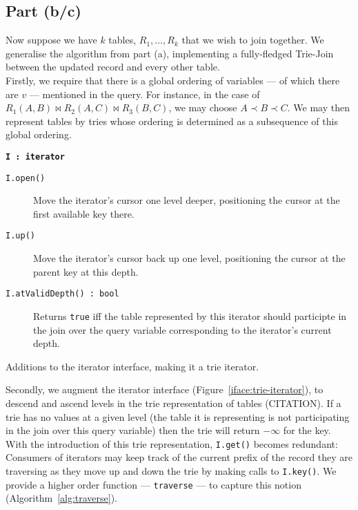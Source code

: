 \subsection{Part (b/c)}\label{sec:q-1-b}

Now suppose we have $k$ tables, $R_1,\ldots,R_k$ that we wish to join together. We generalise the algorithm from part (a), implementing a fully-fledged Trie-Join between the updated record and every other table.\\[1em]

Firstly, we require that there is a global ordering of variables --- of which there are $v$ --- mentioned in the query. For instance, in the case of $R_1(A,B)\bowtie R_2(A,C)\bowtie R_3(B,C)$, we may choose $A\prec B\prec C$. We may then represent tables by tries whose ordering is determined as a subsequence of this global ordering.\\[1em]

\begin{marginfigure}
  \textbf{\texttt{I\,:\,iterator}}
  \begin{description}
    \item[\texttt{I.open()}]
      Move the iterator's cursor one level deeper, positioning the cursor at the first available key there.
    \item[\texttt{I.up()}]
      Move the iterator's cursor back up one level, positioning the cursor at the parent key at this depth.
    \item[\texttt{I.atValidDepth()\,:\,bool}]
      Returns \texttt{true} iff the table represented by this iterator should participte in the join over the query variable corresponding to the iterator's current depth.
  \end{description}
  \caption{Additions to the iterator interface, making it a trie iterator.}\label{iface:trie-iterator}
\end{marginfigure}

Secondly, we augment the iterator interface (Figure~\ref{iface:trie-iterator}), to descend and ascend levels in the trie representation of tables (CITATION). If a trie has no values at a given level (the table it is representing is not participating in the join over this query variable) then the trie will return $-\infty$ for the key.\\[1em]

With the introduction of this trie representation, \texttt{I.get()} becomes redundant: Consumers of iterators may keep track of the current prefix of the record they are traversing as they move up and down the trie by making calls to \texttt{I.key()}. We provide a higher order function --- \texttt{traverse} --- to capture this notion (Algorithm~\ref{alg:traverse}).\\[1em]

